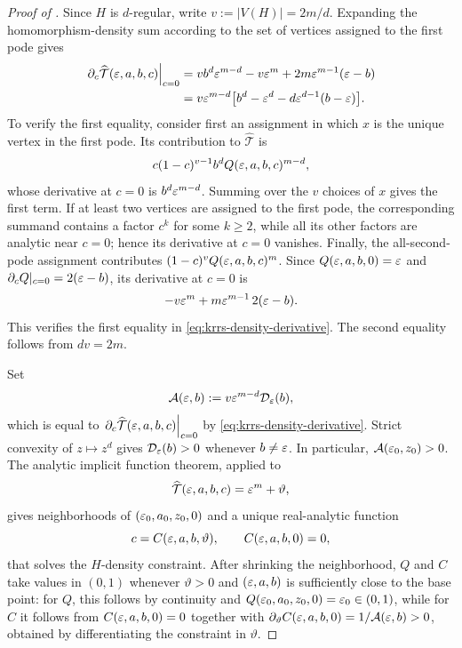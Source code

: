 \begin{proof}[Proof of ]
Since \(H\) is \(d\)-regular, write \(v:=|V(H)|=2m/d\).
Expanding the homomorphism-density sum
according to the set of vertices assigned to the first pode gives
\begin{align}
  \left.\partial_c\widehat{\mathcal T}(\varepsilon,a,b,c)\right|_{c=0}
  &=vb^d\varepsilon^{m-d}
    -v\varepsilon^m+2m\varepsilon^{m-1}(\varepsilon-b)\notag\\
  &=v\varepsilon^{m-d}
      \bigl[b^d-\varepsilon^d-d\varepsilon^{d-1}(b-\varepsilon)\bigr].
      \label{eq:krrs-density-derivative}
\end{align}
To verify the first equality, consider first an assignment in which \(x\) is
the unique vertex in the first pode.  Its contribution to
\(\widehat{\mathcal T}\) is
\[
  c(1-c)^{v-1}b^d
  Q(\varepsilon,a,b,c)^{m-d},
\]
whose derivative at \(c=0\) is
\(b^d\varepsilon^{m-d}\).  Summing over the \(v\) choices of \(x\) gives the first
term.  If at least two vertices are assigned to the first pode, the
corresponding summand contains a factor \(c^k\) for some \(k\ge2\), while
all its other factors are analytic near \(c=0\); hence its derivative at
\(c=0\) vanishes.  Finally, the all-second-pode assignment contributes
\((1-c)^vQ(\varepsilon,a,b,c)^m\).  Since \(Q(\varepsilon,a,b,0)=\varepsilon\) and
\(\partial_cQ|_{c=0}=2(\varepsilon-b)\), its derivative at \(c=0\) is
\[
  -v\varepsilon^m+m\varepsilon^{m-1}\,2(\varepsilon-b).
\]
This verifies the first equality in \eqref{eq:krrs-density-derivative}.
The second equality follows from \(dv=2m\).

Set
\begin{equation}\label{eq:krrs-density-coefficient}
  \mathcal A(\varepsilon,b)
  :=v\varepsilon^{m-d}\mathcal D_\varepsilon(b),
\end{equation}
which is equal to $\left.\partial_c\widehat{\mathcal T}(\varepsilon,a,b,c)\right|_{c=0}$ by \eqref{eq:krrs-density-derivative}.
Strict convexity of \(z\mapsto z^d\) gives
\(\mathcal D_\varepsilon(b)>0\) whenever \(b\ne\varepsilon\).  In particular,
\(\mathcal A(\varepsilon_0,z_0)>0\).  The analytic implicit function theorem,
applied to
\[
  \widehat{\mathcal T}(\varepsilon,a,b,c)=\varepsilon^m+\vartheta,
\]
gives neighborhoods of \((\varepsilon_0,a_0,z_0,0)\) and a unique
real-analytic function
\begin{equation}\label{eq:krrs-density-constraint}
  c=C(\varepsilon,a,b,\vartheta),
  \qquad
  C(\varepsilon,a,b,0)=0,
\end{equation}
that solves the \(H\)-density constraint.  After shrinking the
neighborhood, \(Q\) and \(C\) take values in \((0,1)\) whenever
\(\vartheta>0\) and \((\varepsilon,a,b)\) is sufficiently close to the base point:
for \(Q\), this follows by continuity and
\(Q(\varepsilon_0,a_0,z_0,0)=\varepsilon_0\in(0,1)\), while for \(C\) it follows from
\(C(\varepsilon,a,b,0)=0\) together with
\(\partial_\vartheta C(\varepsilon,a,b,0)=1/\mathcal A(\varepsilon,b)>0\), obtained by
differentiating the constraint in \(\vartheta\).


\end{proof}

